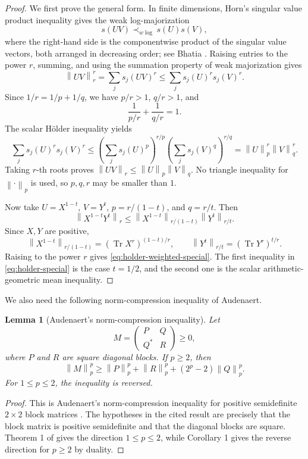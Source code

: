 \documentclass[11pt]{amsart}
\numberwithin{equation}{section}
\newtheorem{lemma}[theorem]{Lemma}
\newcommand{\Tr}{\operatorname{Tr}}
\newcommand{\norm}[1]{\left\lVert #1\right\rVert}
\begin{document}
\begin{proof}
We first prove the general form.  In finite dimensions, Horn's singular value product inequality gives the weak log-majorization
\[
    s(UV)\prec_{w\log} s(U)s(V),
\]
where the right-hand side is the componentwise product of the singular value vectors, both arranged in decreasing order; see Bhatia \cite[Chapter III]{Bhatia1997}.  Raising entries to the power \(r\), summing, and using the summation property of weak majorization gives
\[
    \norm{UV}_r^r
    =\sum_j s_j(UV)^r
    \le
    \sum_j s_j(U)^r s_j(V)^r.
\]
Since \(1/r=1/p+1/q\), we have \(p/r>1\), \(q/r>1\), and
\[
    \frac{1}{p/r}+\frac{1}{q/r}=1.
\]
The scalar H\"older inequality yields
\[
    \sum_j s_j(U)^r s_j(V)^r
    \le
    \left(\sum_j s_j(U)^p\right)^{r/p}
    \left(\sum_j s_j(V)^q\right)^{r/q}
    =
    \norm{U}_p^r\norm{V}_q^r.
\]
Taking \(r\)-th roots proves \(\norm{UV}_r\le \norm{U}_p\norm{V}_q\).  No triangle inequality for \(\norm{\cdot}_p\) is used, so \(p,q,r\) may be smaller than \(1\).

Now take \(U=X^{1-t}\), \(V=Y^t\), \(p=r/(1-t)\), and \(q=r/t\).  Then
\[
    \norm{X^{1-t}Y^t}_r
    \le
    \norm{X^{1-t}}_{r/(1-t)}
    \norm{Y^t}_{r/t}.
\]
Since \(X,Y\) are positive,
\[
    \norm{X^{1-t}}_{r/(1-t)}=(\Tr X^r)^{(1-t)/r},
    \qquad
    \norm{Y^t}_{r/t}=(\Tr Y^r)^{t/r}.
\]
Raising to the power \(r\) gives \eqref{eq:holder-weighted-special}.  The first inequality in \eqref{eq:holder-special} is the case \(t=1/2\), and the second one is the scalar arithmetic-geometric mean inequality.
\end{proof}

We also need the following norm-compression inequality of Audenaert.

\begin{lemma}[Audenaert's norm-compression inequality]\label{lem:compression}
Let
\[
    M=\begin{pmatrix}P&Q\\ Q^*&R\end{pmatrix}\ge 0,
\]
where \(P\) and \(R\) are square diagonal blocks.  If \(p\ge 2\), then
\begin{equation}\label{eq:compression}
    \norm{M}_p^p
    \ge
    \norm{P}_p^p+\norm{R}_p^p+(2^p-2)\norm{Q}_p^p.
\end{equation}
For \(1\le p\le 2\), the inequality is reversed.
\end{lemma}

\begin{proof}
This is Audenaert's norm-compression inequality for positive semidefinite \(2\times2\) block matrices \cite[Theorem 1 and Corollary 1]{Audenaert2006NormCompression}.  The hypotheses in the cited result are precisely that the block matrix is positive semidefinite and that the diagonal blocks are square.  Theorem 1 of \cite{Audenaert2006NormCompression} gives the direction \(1\le p\le 2\), while Corollary 1 gives the reverse direction for \(p\ge 2\) by duality.
\end{proof}
\end{document}
